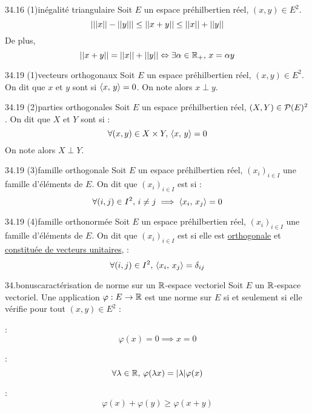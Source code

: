 \begin{adjustwidth}{-3cm}{-3cm}
\begin{theoreme}{34.16 (1)}{inégalité triangulaire}
    Soit $E$ un espace préhilbertien réel, $(x,y) \in E^2$.
    $$|||x||-{||y||}| \leq ||x+y|| \leq ||x|| + ||y||$$
    De plus, 
    $$||x+y|| = ||x|| + ||y|| \Leftrightarrow \exists \alpha \in \mathbb{R}_+, \,x = \alpha y$$
\end{theoreme}

\begin{definition}{34.19 (1)}{vecteurs orthogonaux}
    Soit $E$ un espace préhilbertien réel, $(x,y) \in E^2$.
    On dit que $x$ et $y$ sont  si $\left\langle x ,\, y \right\rangle = 0$. On note alors $x \perp y$.
\end{definition}

\begin{definition}{34.19 (2)}{parties orthogonales}
    Soit $E$ un espace préhilbertien réel, $(X,Y) \in \mathcal{P}(E)^2$.
    On dit que $X$ et $Y$ sont  si :
    $$\forall (x,y) \in X \times Y, \,\left\langle x ,\, y \right\rangle = 0$$
    On note alors $X \perp Y$.
\end{definition}

\begin{definition}{34.19 (3)}{famille orthogonale}
    Soit $E$ un espace préhilbertien réel, $(x_i)_{i \in I}$ une famille d'éléments de $E$.
    On dit que $(x_i)_{i \in I}$ est  si :
    $$\forall (i,j) \in I^2,\, i \neq j \implies \left\langle x_i ,\, x_j \right\rangle = 0$$
\end{definition}

\begin{definition}{34.19 (4)}{famille orthonormée}
    Soit $E$ un espace préhilbertien réel, $(x_i)_{i \in I}$ une famille d'éléments de $E$.
    On dit que $(x_i)_{i \in I}$ est  si elle est \underline{orthogonale} et \underline{constituée de vecteurs unitaires}, \ie :
    $$\forall (i,j) \in I^2, \,\left\langle x_i ,\, x_j \right\rangle = \delta_{ij}$$
\end{definition}

\begin{proposition}{34.bonus}{caractérisation de norme sur un $\mathbb{R}$-espace vectoriel}
    Soit $E$ un $\mathbb{R}$-espace vectoriel. Une application $\varphi : E \to \mathbb{R}$ est une norme sur $E$ si et seulement si elle vérifie pour tout $(x,y) \in E^2$ :  
    \begin{enumeratebf}
        \item {} : 
            $$\varphi(x) = 0 \implies x = 0$$
        \item {} : 
            $$\forall \lambda \in \mathbb{R},\, \varphi(\lambda x) = |\lambda| \varphi(x)$$
        \item {} :
            $$\varphi(x) + \varphi(y) \geq \varphi(x + y)$$
    \end{enumeratebf}
    

\end{proposition}
\end{adjustwidth}
